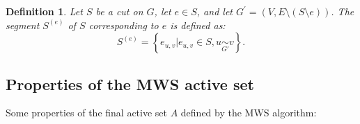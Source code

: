 \documentclass[12pt]{article}
\newcommand\TODO[1]{\fbox{\textcolor{red}{TODO: #1}}}
\newtheorem{definition}{Definition}[section]
\begin{document}
\begin{definition}
Let $S$ be a cut on $G$, let $e\in S$,  and let $G^{'}=(V,E\setminus(S\setminus {e}))$. The segment $S^{(e)}$ of $S$ corresponding to $e$ is defined as:
\begin{equation}
S^{(e)} = \left\{ e_{u,v} \big| e_{u,v} \in S, u \underset{G'}{\sim}v   \right\}.
\end{equation}
\end{definition}
\TODO{Missing definition of energy $T$, MWS objective, algorithm, etc...}


\subsection{Properties of the MWS active set}

Some properties of the final active set $A$ defined by the MWS algorithm:
\end{document}
